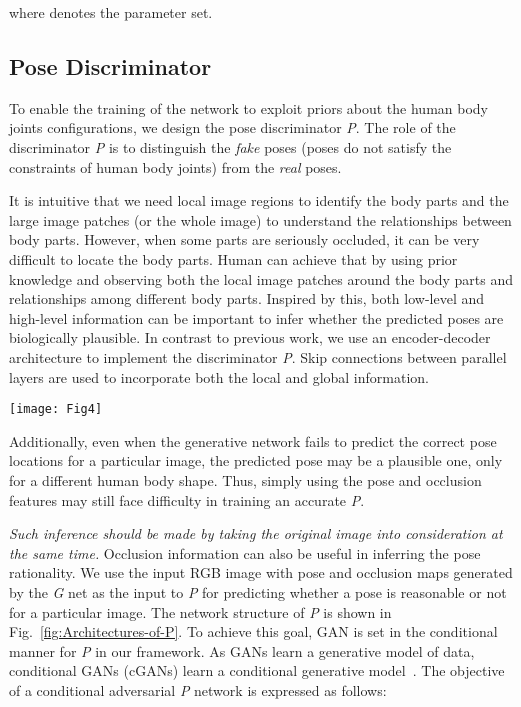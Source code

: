\documentclass[10pt,letterpaper,twocolumn]{article}
\begin{document}
where  denotes the parameter set.


\subsection{Pose Discriminator}\label{subsec:Pose-Discriminator}

To enable the training of the network to exploit priors about the human body joints configurations, we design the pose discriminator \textit{P}. The role of the discriminator \emph{P} is to distinguish the {\it fake} poses (poses do not satisfy the constraints of human body joints) from the {\it real} poses.

It is intuitive that we need local image regions to identify the body parts and the large image patches (or the whole image) to understand the relationships between body parts. However, when some parts are seriously occluded, it can  be very difficult  to locate the body parts. Human can achieve that by  using
prior knowledge and observing both the local image patches around the body parts and relationships among different body parts. Inspired by this, both low-level and high-level information can be important to infer whether the predicted poses are biologically plausible. In contrast to previous work, we use an encoder-decoder architecture to implement the discriminator \emph{P}. Skip connections between parallel layers are used to incorporate both the local and global information.

\begin{figure*}[!t]
\centering
\texttt{[image: Fig4]}
\caption{Architectures of the discriminator network \textit{P} and \textit{C}.}
\label{fig:Architectures-of-P}
\end{figure*}

Additionally, even when the generative network fails to predict the correct pose locations for a particular image, the predicted pose may be a plausible one, only for a different human body shape. Thus, simply using the pose and occlusion features may still face difficulty in training an accurate \textit{P}.

{\it Such inference should be made by taking the original image into consideration at the same time.} Occlusion information can also be useful in inferring the pose rationality. We use the input RGB image with pose and occlusion maps generated by the \textit{G} net as the input to \textit{P} for predicting whether a pose is reasonable or not for a particular image. The network structure of \textit{P} is shown in Fig.~\ref{fig:Architectures-of-P}.
To achieve this goal, GAN is set in the conditional manner for \textit{P} in our framework. As GANs learn a generative model of data, conditional GANs (cGANs) learn a conditional generative model~\cite{conf/nips/GoodfellowPMXWOCB14}. The objective of a conditional adversarial \textit{P} network is expressed as follows:
\end{document}
